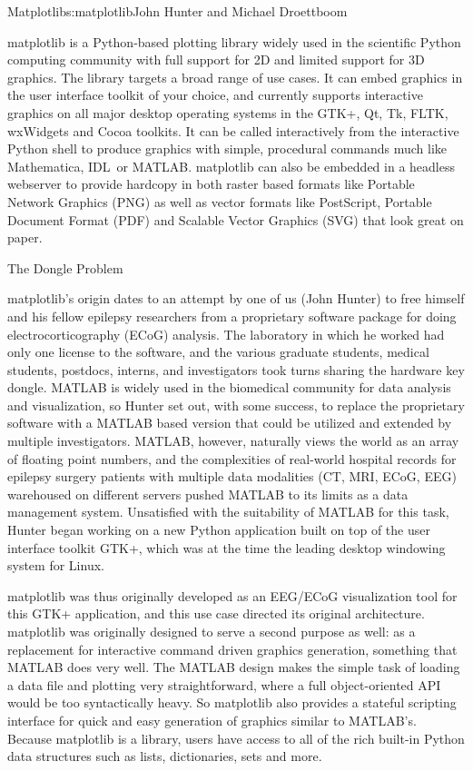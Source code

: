\begin{aosachapter}{Matplotlib}{s:matplotlib}{John Hunter and Michael Droettboom}

matplotlib is a Python-based plotting library widely used in
the scientific Python computing community with full support for 2D and
limited support for 3D graphics.  The library targets a broad range of
use cases.  It can embed graphics in the user interface toolkit of
your choice, and currently supports interactive graphics on all major
desktop operating systems in the GTK+, Qt, Tk, FLTK, wxWidgets and
Cocoa toolkits.  It can be called interactively from the
interactive Python shell to produce graphics with simple, procedural
commands much like Mathematica\texttrademark, IDL\texttrademark\ or
MATLAB\texttrademark.  matplotlib can also be embedded in a headless
webserver to provide hardcopy in both raster based formats like
Portable Network Graphics (PNG) as well as vector formats like
PostScript, Portable Document Format (PDF) and Scalable Vector
Graphics (SVG) that look great on paper.

\begin{aosasect1}{The Dongle Problem}

matplotlib's origin dates to an attempt by one of us (John Hunter) to
free himself and his fellow epilepsy researchers from a proprietary
software package for doing electrocorticography (ECoG) analysis.  The
laboratory in which he worked had only one license to the software,
and the various graduate students, medical students, postdocs, interns,
and investigators took turns sharing the hardware key dongle.
MATLAB is widely used in the biomedical community for
data analysis and visualization, so Hunter set out, with some success,
to replace the proprietary software with a MATLAB based version that
could be utilized and extended by multiple investigators.  MATLAB,
however, naturally views the world as an array of floating point
numbers, and the complexities of real-world hospital records for
epilepsy surgery patients with multiple data modalities (CT, MRI,
ECoG, EEG) warehoused on different servers pushed MATLAB to its limits
as a data management system.  Unsatisfied with the suitability of
MATLAB for this task, Hunter began working on a new Python application
built on top of the user interface toolkit GTK+, which was at the time
the leading desktop windowing system for Linux.

matplotlib was thus originally developed as an EEG/ECoG visualization
tool for this GTK+ application, and this use case directed its
original architecture.  matplotlib was originally designed to serve a
second purpose as well: as a replacement for interactive command
driven graphics generation, something that MATLAB does very well.  The
MATLAB design makes the simple task of loading a data file and
plotting very straightforward, where a full object-oriented API would
be too syntactically heavy.  So matplotlib also provides a stateful
scripting interface for quick and easy generation of graphics similar
to MATLAB's.  Because matplotlib is a library, users have access to
all of the rich built-in Python data structures such as lists,
dictionaries, sets and more.


\end{aosasect1}
\end{aosachapter}

